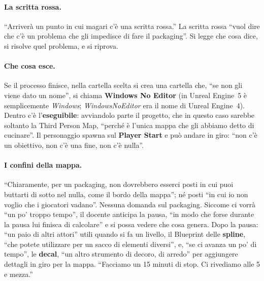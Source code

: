 \paragraph{La scritta rossa.} ``Arriverà un punto in cui magari c'è una scritta rossa.'' La
scritta rossa ``vuol dire che c'è un problema che gli impedisce di fare il packaging''. Si legge
che cosa dice, si risolve quel problema, e si riprova.

\paragraph{Che cosa esce.} Se il processo finisce, nella cartella scelta si crea una cartella
che, ``se non gli viene dato un nome'', si chiama \textbf{Windows No Editor} (in Unreal
Engine~5 è semplicemente \emph{Windows}; \emph{WindowsNoEditor} era il nome di Unreal
Engine~4). Dentro c'è l'\textbf{eseguibile}: avviandolo parte il progetto, che in questo caso
sarebbe soltanto la Third Person Map, ``perché è l'unica mappa che gli abbiamo detto di
cucinare''. Il personaggio spawna sul \textbf{Player Start} e può andare in giro: ``non c'è un
obiettivo, non c'è una fine, non c'è nulla''.

\paragraph{I confini della mappa.} ``Chiaramente, per un packaging, non dovrebbero esserci
posti in cui puoi buttarti di sotto nel nulla, come il bordo della mappa''; né posti ``in cui
io non voglio che i giocatori vadano''. Nessuna domanda sul packaging. Siccome ci vorrà ``un
po' troppo tempo'', il docente anticipa la pausa, ``in modo che forse durante la pausa lui
finisca di calcolare'' e si possa vedere che cosa genera. Dopo la pausa: ``un paio di altri
attori'' utili quando si fa un livello, il Blueprint delle \textbf{spline}, ``che potete
utilizzare per un sacco di elementi diversi'', e, ``se ci avanza un po' di tempo'', le
\textbf{decal}, ``un altro strumento di decoro, di arredo'' per aggiungere dettagli in giro per
la mappa. ``Facciamo un 15 minuti di stop. Ci rivediamo alle 5 e mezza.''


